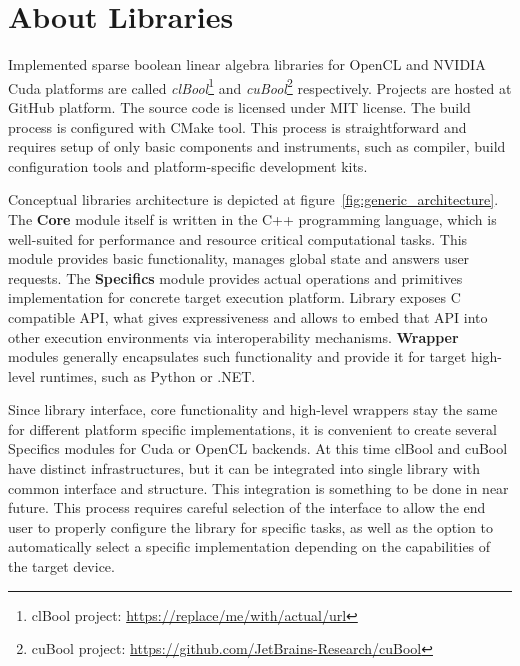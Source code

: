 \section{About Libraries}



Implemented sparse boolean linear algebra libraries for OpenCL and NVIDIA Cuda platforms are called
\textit{clBool}\footnote{clBool project: \url{https://replace/me/with/actual/url}} and \textit{cuBool}\footnote{cuBool project: \url{https://github.com/JetBrains-Research/cuBool}} respectively.
Projects are hosted at GitHub platform. The source code is licensed under MIT license.
The build process is configured with CMake tool. 
This process is straightforward and requires setup of only basic components and instruments, such as compiler, build configuration tools and platform-specific development kits.

Conceptual libraries architecture is depicted at figure~\ref{fig:generic_architecture}. 
The \textbf{Core} module itself is written in the C++ programming language, which is well-suited for performance and resource critical computational tasks. 
This module provides basic functionality, manages global state and answers user requests. 
The \textbf{Specifics} module provides actual operations and primitives implementation for concrete target execution platform.
Library exposes C compatible API, what gives expressiveness and allows to embed that API into other execution environments via interoperability mechanisms.
\textbf{Wrapper} modules generally encapsulates such functionality and provide it for target high-level runtimes, such as Python or .NET. 

Since library interface, core functionality and high-level wrappers stay the same for different platform specific implementations, it is convenient to create several Specifics modules for Cuda or OpenCL backends.
At this time clBool and cuBool have distinct infrastructures, but it can be integrated into single library with common interface and structure. 
This integration is something to be done in near future.
This process requires careful selection of the interface to allow the end user to properly configure the library for specific tasks, as well as the option to automatically select a specific implementation depending on the capabilities of the target device.

